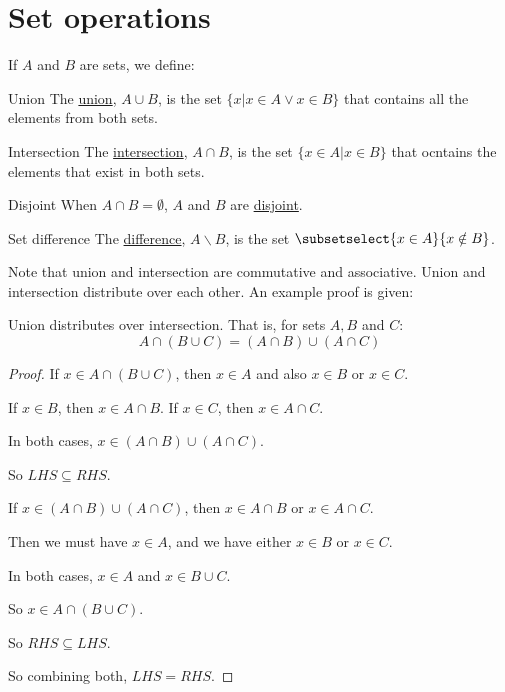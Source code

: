 \documentclass[../Main.tex]{subfiles}
\begin{document}
\section{Set operations}
If $A$ and $B$ are sets, we define:
\begin{definition}{Union}
    The \underline{union}, $A \cup B$, is the set $\{x | x \in A \lor x \in B\}$ that contains all the elements from both sets.
\end{definition}
\begin{definition}{Intersection}
    The \underline{intersection}, $A \cap B$, is the set $\{x \in A | x \in B\}$ that ocntains the elements that exist in both sets.
\end{definition}
\begin{definition}{Disjoint}
    When $A \cap B = \emptyset$, $A$ and $B$ are \underline{disjoint}.
\end{definition}
\begin{definition}{Set difference}
    The \underline{difference}, $A \backslash B$, is the set $\subsetselect{x \in A}{x \notin B}$.
\end{definition}
Note that union and intersection are commutative and associative. Union and intersection distribute over each other. An example proof is given:
\begin{proposition}
    Union distributes over intersection. That is, for sets $A, B$ and $C$:
    \begin{equation*}
        A \cap (B \cup C) = (A \cap B) \cup (A \cap C)
    \end{equation*}
    \label{propUnionDist}
\end{proposition}
\begin{proof}
    If $x \in A \cap (B \cup C)$, then $x \in A$ and also $x \in B$ or $x \in C$.\par
    If $x \in B$, then $x \in A \cap B$. If $x \in C$, then $x \in A \cap C$.\par
    In both cases, $x \in (A \cap B) \cup (A \cap C)$.\par
    So $LHS \subseteq RHS$.\par
    If $x \in (A \cap B) \cup (A \cap C)$, then $x \in A \cap B$ or $x \in A \cap C$.\par
    Then we must have $x \in A$, and we have either $x \in B$ or $x \in C$.\par
    In both cases, $x \in A$ and $x \in B \cup C$.\par
    So $x \in A \cap (B \cup C)$.\par
    So $RHS \subseteq LHS$.\par
    So combining both, $LHS = RHS$.
\end{proof}
\end{document}
